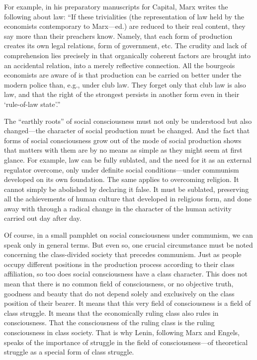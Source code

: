 \documentclass[../main]{subfiles}
\begin{document}
For example, in his preparatory manuscripts for Capital, Marx writes the following about law: “If these trivialities (the representation of law held by the economists contemporary to Marx—ed.) are reduced to their real content, they say more than their preachers know. Namely, that each form of production creates its own legal relations, form of government, etc. The crudity and lack of comprehension lies precisely in that organically coherent factors are brought into an accidental relation, into a merely reflective connection. All the bourgeois economists are aware of is that production can be carried on better under the modern police than, e.g., under club law. They forget only that club law is also law, and that the right of the strongest persists in another form even in their ‘rule-of-law state’.”

The “earthly roots” of social consciousness must not only be understood but also changed—the character of social production must be changed. And the fact that forms of social consciousness grow out of the mode of social production shows that matters with them are by no means as simple as they might seem at first glance. For example, law can be fully sublated, and the need for it as an external regulator overcome, only under definite social conditions—under communism developed on its own foundation. The same applies to overcoming religion. It cannot simply be abolished by declaring it false. It must be sublated, preserving all the achievements of human culture that developed in religious form, and done away with through a radical change in the character of the human activity carried out day after day.

Of course, in a small pamphlet on social consciousness under communism, we can speak only in general terms. But even so, one crucial circumstance must be noted concerning the class-divided society that precedes communism. Just as people occupy different positions in the production process according to their class affiliation, so too does social consciousness have a class character. This does not mean that there is no common field of consciousness, or no objective truth, goodness and beauty that do not depend solely and exclusively on the class position of their bearer. It means that this very field of consciousness is a field of class struggle. It means that the economically ruling class also rules in consciousness. That the consciousness of the ruling class is the ruling consciousness in class society. That is why Lenin, following Marx and Engels, speaks of the importance of struggle in the field of consciousness—of theoretical struggle as a special form of class struggle.
\end{document}
